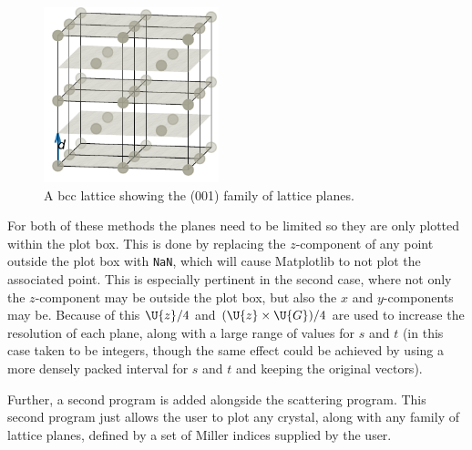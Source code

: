 \documentclass[main.tex]{subfiles}
\begin{document}
	\begin{figure}
		\includegraphics[width=2in]{figures/lattice_planes_1.pdf}
		\caption{A bcc lattice showing the (001) family of lattice planes.}
		\label{fig:lattice_planes}
	\end{figure}
	For both of these methods the planes need to be limited so they are only plotted within the plot box. This is done by replacing the $ z $-component of any point outside the plot box with \texttt{NaN}, which will cause Matplotlib to not plot the associated point. This is especially pertinent in the second case, where not only the $ z $-component may be outside the plot box, but also the $ x $ and $ y $-components may be. Because of this $ \U{z}/4 $ and $ (\U{z} \times \U{G})/4 $ are used to increase the resolution of each plane, along with a large range of values for $ s $ and $ t $ (in this case taken to be integers, though the same effect could be achieved by using a more densely packed interval for $ s $ and $ t $ and keeping the original vectors).
	
	 
	Further, a second program is added alongside the scattering program. This second program just allows the user to plot any crystal, along with any family of lattice planes, defined by a set of Miller indices supplied by the user.
	
\end{document}
